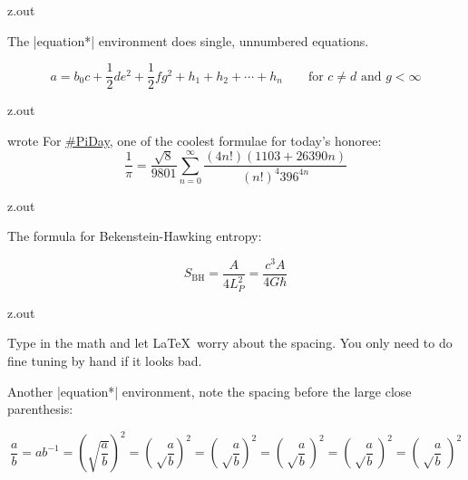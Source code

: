 \MyIO


\begin{VerbatimOut}{z.out}

The
|equation*|
environment does single, unnumbered equations.

\begin{equation*}
  a = b_0c + \frac12 de^2 + {\textstyle \frac12} fg^2
    + h_1 + h_2 + \cdots + h_n
    \qquad \text{for \(c \ne d\) and \(g < \infty\)}
\end{equation*}
\end{VerbatimOut}

\MyIO


\begin{VerbatimOut}{z.out}

\textcite{greene-2021-03-14}
wrote
  For
  \href{https://twitter.com/hashtag/PiDay?src=hashtag\_click\#PiDay}{\#PiDay},
  one of the coolest formulae for today's honoree:
  \[
    \frac 1\pi
    =
    \frac {\sqrt8} {9801}
    \sum_{n=0}^\infty
    \frac  {(4n!) (1103+26390n)}  {(n!)^4 396^{4n}}
  \]
\end{VerbatimOut}

\MyIO


\begin{VerbatimOut}{z.out}

The formula for Bekenstein-Hawking entropy:

\begin{equation*}
  S_\text{BH}
  =
  \frac A {4L_P^2}
  = \frac {c^3A} {4G\hbar}
\end{equation*}
\end{VerbatimOut}

\MyIO


\begin{VerbatimOut}{z.out}

Type in the math and let \LaTeX\ worry about the spacing.
You only need to do fine tuning by hand if it looks bad.

Another
|equation*|
environment,
note the spacing before the large close parenthesis:

\begin{equation*}
  \frac ab
    = ab^{-1}
    = (\sqrt{\frac ab})^2
    = \left( \sqrt\frac ab \right)^2
    = \left( \sqrt\frac ab \!\right)^2
    = \left( \sqrt\frac ab \,\right)^2
    = \left( \sqrt\frac ab \:\right)^2
    = \left( \sqrt\frac ab \;\right)^2
\end{equation*}
\end{VerbatimOut}

